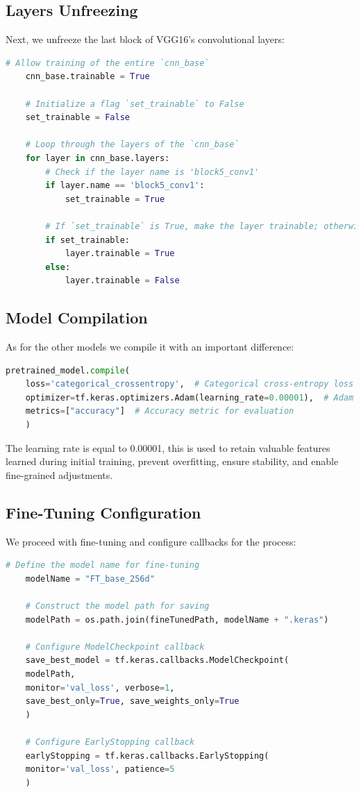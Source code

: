 \subsection{Layers Unfreezing}

Next, we unfreeze the last block of VGG16's convolutional layers:

\begin{lstlisting}[language=Python]
	# Allow training of the entire `cnn_base`
	cnn_base.trainable = True
	
	# Initialize a flag `set_trainable` to False
	set_trainable = False
	
	# Loop through the layers of the `cnn_base`
	for layer in cnn_base.layers:
		# Check if the layer name is 'block5_conv1'
		if layer.name == 'block5_conv1':
			set_trainable = True
		
		# If `set_trainable` is True, make the layer trainable; otherwise, freeze it
		if set_trainable:
			layer.trainable = True
		else:
			layer.trainable = False

\end{lstlisting}

\subsection{Model Compilation}

As for the other models we compile it with an important difference:

\begin{lstlisting}[language=Python]
	pretrained_model.compile(
	loss='categorical_crossentropy',  # Categorical cross-entropy loss
	optimizer=tf.keras.optimizers.Adam(learning_rate=0.00001),  # Adam optimizer with a custom learning rate
	metrics=["accuracy"]  # Accuracy metric for evaluation
	)
\end{lstlisting}

The learning rate is equal to 0.00001, this is used to retain valuable features learned during initial training, 
prevent overfitting, ensure stability, and enable fine-grained adjustments.

\subsection{Fine-Tuning Configuration}

We proceed with fine-tuning and configure callbacks for the process:

\begin{lstlisting}[language=Python]
	# Define the model name for fine-tuning
	modelName = "FT_base_256d"
	
	# Construct the model path for saving
	modelPath = os.path.join(fineTunedPath, modelName + ".keras")
	
	# Configure ModelCheckpoint callback
	save_best_model = tf.keras.callbacks.ModelCheckpoint(
	modelPath,
	monitor='val_loss', verbose=1,
	save_best_only=True, save_weights_only=True
	)
	
	# Configure EarlyStopping callback
	earlyStopping = tf.keras.callbacks.EarlyStopping(
	monitor='val_loss', patience=5
	)
\end{lstlisting}

